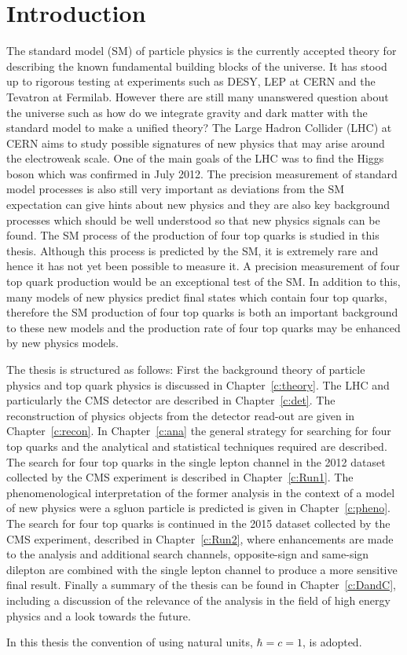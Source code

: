 \chapter{Introduction}
\label{c:intro}

The standard model (SM) of particle physics is the currently accepted theory for describing the known fundamental building blocks of the universe. It has stood up to rigorous testing at experiments such as DESY, LEP at CERN and the Tevatron at Fermilab. However there are still many unanswered question about the universe such as how do we integrate gravity and dark matter with the standard model to make a unified theory?
The Large Hadron Collider (LHC) at CERN aims to study possible signatures of new physics that may arise around the electroweak scale. One of the main goals of the LHC was to find the Higgs boson which was confirmed in July 2012. The precision measurement of standard model processes is also still very important as deviations from the SM expectation can give hints about new physics and they are also key background processes which should be well understood so that new physics signals can be found.
The SM process of the production of four top quarks is studied in this thesis. Although this process is predicted by the SM, it is extremely rare and hence it has not yet been possible to measure it. A precision measurement of four top quark production would be an exceptional test of the SM. In addition to this, many models of new physics predict final states which contain four top quarks, therefore the SM production of four top quarks is both an important background to these new models and the production rate of four top quarks may be enhanced by new physics models.

The thesis is structured as follows: First the background theory of particle physics and top quark physics is discussed in Chapter~\ref{c:theory}. The LHC and particularly the CMS detector are described in Chapter~\ref{c:det}. The reconstruction of physics objects from the detector read-out are given in Chapter~\ref{c:recon}. In Chapter~\ref{c:ana} the general strategy for searching for four top quarks and the analytical and statistical techniques required are described. The search for four top quarks in the single lepton channel in the 2012 dataset collected by the CMS experiment is described in Chapter~\ref{c:Run1}. The phenomenological interpretation of the former analysis in the context of a model of new physics were a sgluon particle is predicted is given in Chapter~\ref{c:pheno}. The search for four top quarks is continued in the 2015 dataset collected by the CMS experiment, described in Chapter~\ref{c:Run2}, where enhancements are made to the analysis and additional search channels, opposite-sign and same-sign dilepton are combined with the single lepton channel to produce a more sensitive final result. Finally a summary of the thesis can be found in Chapter~\ref{c:DandC}, including a discussion of the relevance of the analysis in the field of high energy physics and a look towards the future.

In this thesis the convention of using natural units, $\hbar = c = 1$, is adopted. 